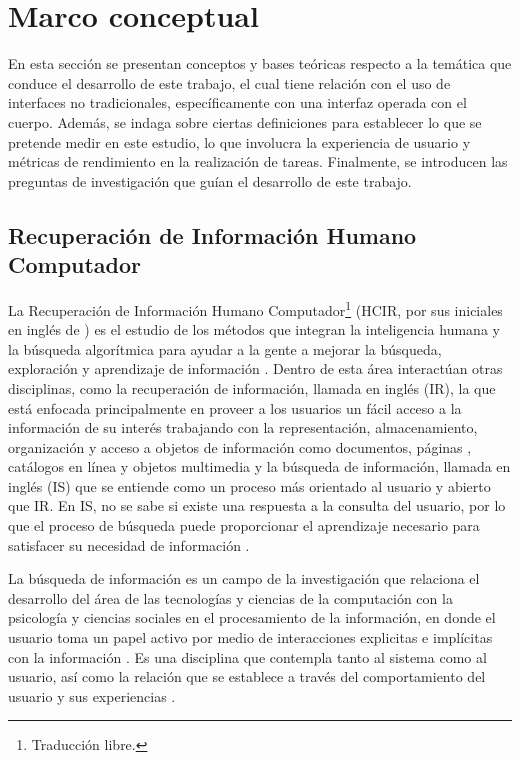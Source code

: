\section{Marco conceptual}
\label{sec:marco_conceptual}
En esta sección se presentan conceptos y bases teóricas respecto a la temática que conduce el desarrollo de este trabajo, el cual tiene relación con el uso de interfaces no tradicionales, específicamente con una interfaz operada con el cuerpo. Además, se indaga sobre ciertas definiciones para establecer lo que se pretende medir en este estudio, lo que involucra la experiencia de usuario y métricas de rendimiento en la realización de tareas. Finalmente, se introducen las preguntas de investigación que guían el desarrollo de este trabajo.

\subsection{Recuperación de Información Humano Computador}
\label{subsec:HCIR}
La Recuperación de Información Humano Computador\footnote{Traducción libre.} (HCIR, por sus iniciales en inglés de ) es el estudio de los métodos que integran la inteligencia humana y la búsqueda algorítmica para ayudar a la gente a mejorar la búsqueda, exploración y aprendizaje de información \parencite{marchionini2006}. Dentro de esta área interactúan otras disciplinas, como la recuperación de información, llamada en inglés  (IR), la que está enfocada principalmente en proveer a los usuarios un fácil acceso a la información de su interés trabajando con la representación, almacenamiento, organización y acceso a objetos de información como documentos, páginas , catálogos en línea y objetos multimedia \parencite{ricardo2011modern} y la búsqueda de información, llamada en inglés  (IS) que se entiende como un proceso más orientado al usuario y abierto que IR. En IS, no se sabe si existe una respuesta a la consulta del usuario, por lo que el proceso de búsqueda puede proporcionar el aprendizaje necesario para satisfacer su necesidad de información \parencite{ricardo2011modern}.

La búsqueda de información es un campo de la investigación que relaciona el desarrollo del área de las tecnologías y ciencias de la computación con la psicología y ciencias sociales en el procesamiento de la información, en donde el usuario toma un papel activo por medio de interacciones explicitas e implícitas con la información \parencite{carroll1997human}. Es una disciplina que contempla tanto al sistema como al usuario, así como la relación que se establece a través del comportamiento del usuario y sus experiencias \parencite{kelly2009methods}.

